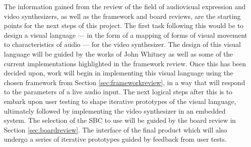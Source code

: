 \documentclass{report}
\begin{document}
The information gained from the review of the field of audiovisual expression and video synthesizers, as well as the framework and board reviews, are the starting points for the next steps of this project. The first task following this would be to design a visual language --- in the form of a mapping of forms of visual movement to characteristics of audio --- for the video synthesizer. The design of this visual language will be guided by the works of John Whitney as well as some of the current implementations highlighted in the framework review. Once this has been decided upon, work will begin in implementing this visual language using the chosen framework from Section \ref{sec:frameworkreview}, in a way that will respond to the parameters of a live audio input. The next logical steps after this is to embark upon user testing to shape iterative prototypes of the visual language, ultimately followed by implementing the video synthesizer in an embedded system. The selection of the SBC to use will be guided by the board review in Section \ref{sec:boardreview}. The interface of the final product which will also undergo a series of iterative prototypes guided by feedback from user tests.
\printbibliography
\end{document}
